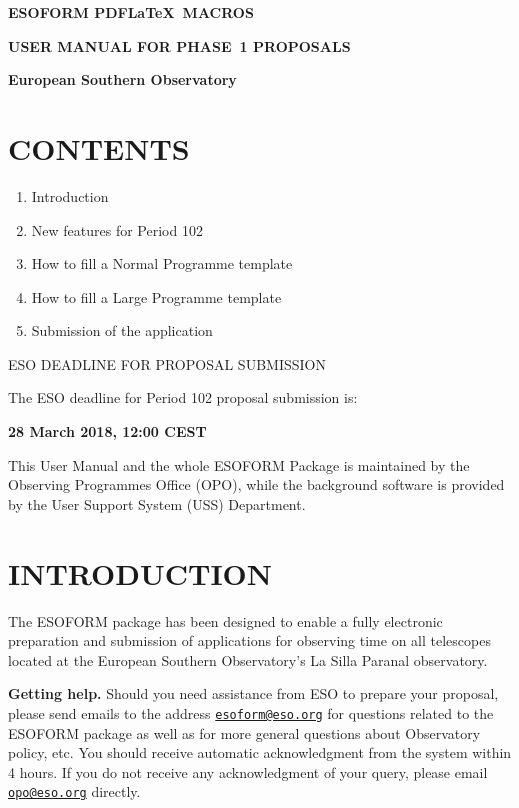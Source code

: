 \documentclass{article}
\begin{document}
\centerline{{\Large{\bf ESOFORM PDF\LaTeX\ MACROS}}}
\bigskip
\centerline{{\Large{\bf USER MANUAL FOR PHASE~1 PROPOSALS }}}
\bigskip
\centerline{{\bf European Southern Observatory }}
\vspace{3cm}

\def\period{102}

\section*{CONTENTS} 

\begin{enumerate}  
\item Introduction 
\item New features for Period 102
\item How to fill a Normal Programme template 
\item How to fill a Large  Programme template 
\item Submission of the application 
\end{enumerate} 

\vspace{3.0truecm}

\centerline{\large ESO DEADLINE FOR PROPOSAL SUBMISSION }
\medskip
\centerline{The ESO deadline for Period 102 proposal submission is:}
\medskip
\centerline{\huge \bf 28 March 2018, 12:00 CEST}

\vfill

\noindent This User Manual and the whole ESOFORM Package is
maintained by the Observing Programmes Office (OPO),
while the background software
is provided by the User Support System (USS) Department.

\break

\section{INTRODUCTION}

The ESOFORM package has been designed to enable a fully
electronic preparation and submission of applications for observing
time on all telescopes located at the European Southern Observatory's
La Silla Paranal observatory.

{\bf Getting help.} Should you need assistance from ESO to prepare
your proposal, please send emails to the address
\href{mailto:esoform@eso.org}{\tt esoform@eso.org} for questions
related to the ESOFORM package as well as for more general questions
about Observatory policy, etc.
You should receive automatic acknowledgment from the system within 
4 hours. If you do not receive any acknowledgment of your query, 
please email 
\href{mailto:opo@eso.org}{\tt opo@eso.org} directly.
\end{document}

